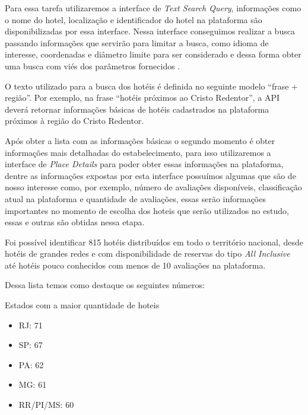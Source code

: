 Para essa tarefa utilizaremos a interface de \emph{Text Search Query}, informações como o nome do hotel, localização e identificador do hotel na plataforma são disponibilizadas por essa interface. Nessa interface conseguimos realizar a busca passando informações que servirão para limitar a busca, como idioma de interesse, coordenadas e diâmetro limite para ser considerado e dessa forma obter uma busca com viés dos parâmetros fornecidos \cite{placesSearchText2023}.



O texto utilizado para a busca dos hotéis é definida no seguinte modelo “frase + região”. Por exemplo, na frase “hotéis próximos ao Cristo Redentor”, a API deverá retornar informações básicas de hotéis cadastrados na plataforma próximos à região do Cristo Redentor.

Após obter a lista com as informações básicas o segundo momento é obter informações mais detalhadas do estabelecimento, para isso utilizaremos a interface de \emph{Place Details} para poder obter essas informações na plataforma, dentre as informações expostas por esta interface possuímos algumas que são de nosso interesse como, por exemplo, número de avaliações disponíveis, classificação atual na plataforma e quantidade de avaliações, essas serão informações importantes no momento de escolha dos hoteis que serão utilizados no estudo, essas e outras são obtidas nessa etapa.



Foi possível identificar 815 hotéis distribuídos em todo o território nacional, desde hotéis de grandes redes e com disponibilidade de reservas do tipo \emph{All Inclusive} até hotéis pouco conhecidos com menos de 10 avaliações na plataforma.

Dessa lista temos como destaque os seguintes números:

Estados com a maior quantidade de hoteis
\begin{itemize}
	\item RJ: 71
	\item SP: 67
	\item PA: 62
	\item MG: 61
	\item RR/PI/MS: 60
\end{itemize}

